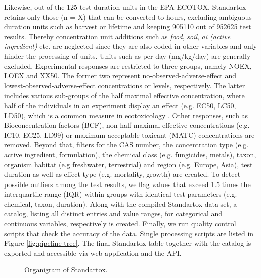 Likewise, out of the 125 test duration units in the EPA ECOTOX, Standartox retains only those (n = X) that can be converted to hours, excluding ambiguous duration units such as harvest or lifetime and keeping 905110 out of 952625 test results. Thereby concentration unit additions such as \textit{food}, \textit{soil}, \textit{ai (active ingredient)} etc. are neglected since they are also coded in other variables and only hinder the processing of units. Units such as per day (mg/kg/day) are generally excluded. Experimental responses are restricted to three groups, namely NOEX, LOEX and XX50. The former two represent no-observed-adverse-effect and lowest-observed-adverse-effect concentrations or levels, respectively. The latter includes various sub-groups of the half maximal effective concentration, where half of the individuals in an experiment display an effect (e.g. EC50, LC50, LD50), which is a common measure in ecotoxicology \citep{malaj_organic_2014}. Other responses, such as Bioconcentration factors (BCF), non-half maximal effective concentrations (e.g. IC10, EC25, LD99) or maximum acceptable toxicant (MATC) concentrations are removed. Beyond that, filters for the CAS number, the concentration type (e.g. active ingredient, formulation), the chemical class (e.g. fungicides, metals), taxon, organism habitat (e.g freshwater, terrestrial) and region (e.g. Europe, Asia), test duration as well as effect type (e.g. mortality, growth) are created. To detect possible outliers among the test results, we flag values that exceed 1.5 times the interquartile range (IQR) within groups with identical test parameters (e.g. chemical, taxon, duration). Along with the compiled Standartox data set, a catalog, listing all distinct entries and value ranges, for categorical and continuous variables, respectively is created. Finally, we run quality control scripts that check the accuracy of the data. Single processing scripts are listed in Figure \ref{fig:pipeline-tree}. The final Standartox table together with the catalog is exported and accessible via web application and the API.

\begin{figure}
    
    \caption{Organigram of Standartox.}
    \label{fig:stx-organigram}
\end{figure}

